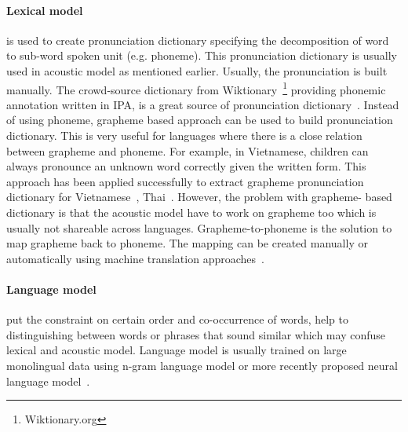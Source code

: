 \documentclass[12pt,twoside,final,hidelinks]{ltthesis}
\theoremstyle{definition}
\begin{document}
\paragraph{Lexical model} is used to create pronunciation dictionary specifying the decomposition of word to sub-word spoken unit (e.g. phoneme). This pronunciation 
dictionary is usually used in acoustic model as mentioned earlier. Usually, the pronunciation is built manually. The crowd-source dictionary from 
Wiktionary~\footnote{Wiktionary.org} providing phonemic annotation written in IPA, is a great source of pronunciation dictionary~\cite{Schlippe2014101}. Instead of 
using phoneme, grapheme based approach can be used to build pronunciation dictionary. This is very useful for languages where there is a close relation between 
grapheme and phoneme. For example, in Vietnamese, children can always pronounce an unknown word correctly given the written form. This approach has been applied 
successfully to extract grapheme pronunciation dictionary for Vietnamese~\cite{Le2009Vn}, Thai~\cite{Stker2008IntegratingTG}. However, the problem with grapheme-
based dictionary is that the acoustic model have to work on grapheme too which is usually not shareable across languages. Grapheme-to-phoneme is the solution to map 
grapheme back to phoneme. The mapping can be created manually or automatically using machine translation approaches~\cite{Karanasou:2010:CSM,Cucu2012}. 

\paragraph{Language model} put the constraint on certain order and co-occurrence of words, help to distinguishing between words or phrases that sound similar which may confuse lexical and acoustic model. Language model is usually trained on large monolingual data using n-gram language model or more recently proposed neural language model~\cite{Collobert:2008,mikolov-yih-zweig:2013:NAACL-HLT,Turian:2010:WRS:1858681.1858721,Huang:2012:IWR:2390524.2390645,pennington2014glove}. 
\end{document}
